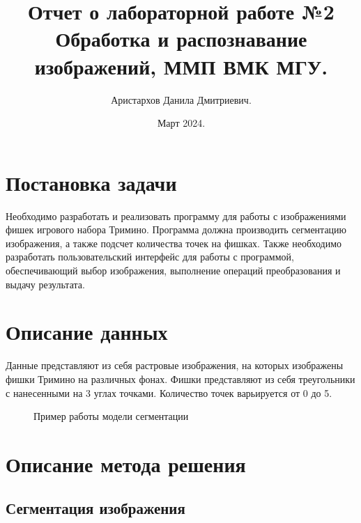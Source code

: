\documentclass[11pt]{extarticle}
\title{Отчет о лабораторной работе №2 \\[6mm] \large Обработка и распознавание изображений, ММП ВМК МГУ.}
\author{Аристархов Данила Дмитриевич.}
\date{Март 2024.}
\begin{document}
\maketitle
{
  \hypersetup{linkcolor=black}
  \tableofcontents
}
\newpage

\section{Постановка задачи}
Необходимо разработать и реализовать программу для работы с изображениями фишек игрового набора Тримино. Программа должна производить сегментацию изображения, а также подсчет количества точек на фишках. Также необходимо разработать пользовательский интерфейс для работы с программой, обеспечивающий выбор изображения, выполнение операций преобразования и выдачу результата.

\section{Описание данных}
Данные представляют из себя растровые изображения, на которых изображены фишки Тримино на различных фонах. Фишки представляют из себя треугольники с нанесенными на 3 углах точками. Количество точек варьируется от 0 до 5.

\begin{figure}[h]
  \centering
  
  \caption{Пример работы модели сегментации}
  \label{fig:segmentate}
\end{figure}

\section{Описание метода решения}
\subsection{Сегментация изображения}
\end{document}
